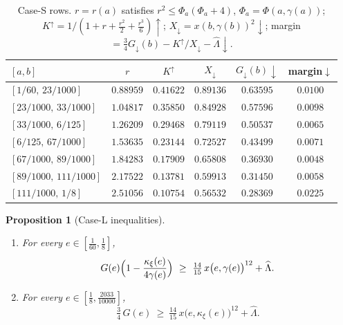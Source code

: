 \documentclass[11pt]{article}
\newtheorem{proposition}[theorem]{Proposition}
\theoremstyle{remark}
\theoremstyle{plain}
\theoremstyle{plain}
\newcommand{\kxi}{\kappa_\xi}
\begin{document}
\begin{table}[h]\centering
\caption{Case-S rows.  $r=r(a)$ satisfies $r^2\le\Phi_a(\Phi_a+4)$,
$\Phi_a=\Phi(a,\gamma(a))$;
$K^\uparrow=1/(1{+}r{+}\tfrac{r^2}2{+}\tfrac{r^3}6)\uparrow$;
$X_\downarrow=x(b,\gamma(b))^2\downarrow$;
margin $=\tfrac34G_\downarrow(b)-K^\uparrow/X_\downarrow-\widehat\Lambda
\downarrow$.}\label{tab:caseS}
\begin{tabular}{lccccc}
\toprule
$[a,b]$ & $r$ & $K^\uparrow$ & $X_\downarrow$ & $G_\downarrow(b)\downarrow$ & margin$\downarrow$\\
\midrule
$[1/60,\,23/1000]$ & $0.88959$ & $0.41622$ & $0.89136$ & $0.63595$ & $0.0100$ \\
$[23/1000,\,33/1000]$ & $1.04817$ & $0.35850$ & $0.84928$ & $0.57596$ & $0.0098$ \\
$[33/1000,\,6/125]$ & $1.26209$ & $0.29468$ & $0.79119$ & $0.50537$ & $0.0065$ \\
$[6/125,\,67/1000]$ & $1.53635$ & $0.23144$ & $0.72527$ & $0.43499$ & $0.0071$ \\
$[67/1000,\,89/1000]$ & $1.84283$ & $0.17909$ & $0.65808$ & $0.36930$ & $0.0048$ \\
$[89/1000,\,111/1000]$ & $2.17522$ & $0.13781$ & $0.59913$ & $0.31450$ & $0.0058$ \\
$[111/1000,\,1/8]$ & $2.51056$ & $0.10754$ & $0.56532$ & $0.28369$ & $0.0225$ \\
\bottomrule
\end{tabular}
\end{table}

\begin{proposition}[Case-L inequalities]\label{prop:caseL}
\begin{enumerate}[label=\textup{(\alph*)},itemsep=1pt]
\item For every $e\in[\tfrac1{60},\tfrac18]$,
\begin{equation}\label{eq:caseLg}
        G(e)\Bigl(1-\frac{\kxi(e)}{4\gamma(e)}\Bigr)
        \ \ge\ \tfrac{14}{15}\,x\bigl(e,\gamma(e)\bigr)^{12}+\widehat\Lambda .
\end{equation}
\item For every $e\in[\tfrac18,\tfrac{2033}{10000}]$,
\begin{equation}\label{eq:caseLx}
        \tfrac34\,G(e)
        \ \ge\ \tfrac{14}{15}\,x\bigl(e,\kxi(e)\bigr)^{12}+\widehat\Lambda .
\end{equation}
\end{enumerate}
\end{proposition}
\end{document}
